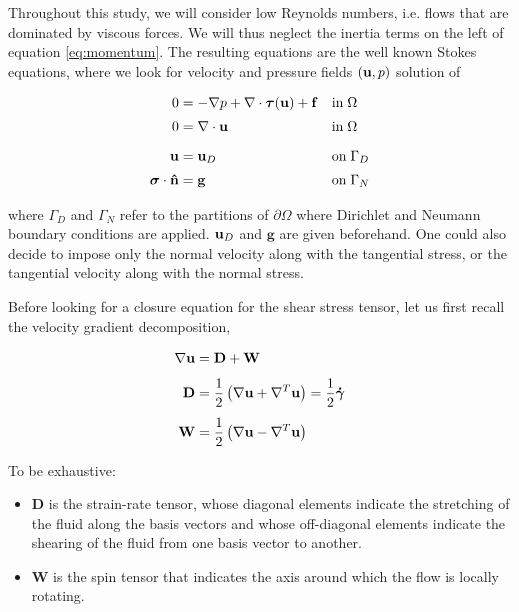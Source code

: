 \documentclass[11 pt]{report}
\begin{document}
Throughout this study, we will consider low Reynolds numbers, i.e. flows that are dominated by viscous forces. We will thus neglect the inertia terms on the left of equation \eqref{eq:momentum}. The resulting equations are the well known Stokes equations, where we look for velocity and pressure fields $(\mathbf{u},p)$ solution of
\begin{empheqboxed}
    \begin{align}
        0 &= -\nabla p + \nabla \cdot \boldsymbol \tau(\mathbf{u}) + \mathbf{f} &&\text{in} \; \Omega \label{eq:momentum} \\[2pt]
        0 &= \nabla \cdot \mathbf{u} &&\text{in}\; \Omega \label{eq:mass}\\[6pt]
        \mathbf{u} &= \mathbf{u}_{D} &&\text{on}\; \Gamma_{D} \label{eq:Dirichlet}\\[2pt]
        \boldsymbol \sigma \cdot \mathbf{\hat n} &= \mathbf{g} &&\text{on}\; \Gamma_{N} \label{eq:Neumann}
    \end{align}
\end{empheqboxed}
where $\Gamma_{D}$ and $\Gamma_{N}$ refer to the partitions of $\partial \Omega$ where Dirichlet and Neumann boundary conditions are applied. $\mathbf{u}_{D}$ and $\mathbf{g}$ are given beforehand. One could also decide to impose only the normal velocity along with the tangential stress, or the tangential velocity along with the normal stress.

Before looking for a closure equation for the shear stress tensor, let us first recall the velocity gradient decomposition,
\begin{empheqboxed}
    \begin{align}
        \nabla \mathbf{u} &= \mathbf{D} + \mathbf{W}\\[4pt]
        \mathbf{D} &= \frac{1}{2} \left(\nabla \mathbf{u} + \nabla^T \mathbf{u}\right) = \frac{1}{2} \boldsymbol{\dot \gamma}\\[4pt]
        \mathbf{W} &= \frac{1}{2} \left(\nabla \mathbf{u} - \nabla^T \mathbf{u}\right)
    \end{align}
\end{empheqboxed}

To be exhaustive:
\begin{itemize}[label=---]
    \item $\mathbf{D}$ is the strain-rate tensor, whose diagonal elements indicate the stretching of the fluid along the basis vectors and whose off-diagonal elements indicate the shearing of the fluid from one basis vector to another.
    \item $\mathbf{W}$ is the spin tensor that indicates the axis around which the flow is locally rotating.
\end{itemize} 
\end{document}
